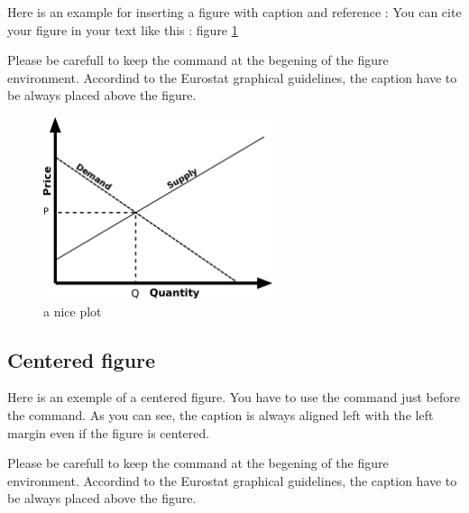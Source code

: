 \documentclass[Theme1]{{template_material/eurostat}}
\begin{document}
Here is an example for inserting a figure with caption and reference :
You can cite your figure in your text like this : figure \ref{fig:figure1}

Please be carefull to keep the  command at the begening of the figure environment. Accordind to the Eurostat graphical guidelines, the caption have to be always placed above the figure.

\begin{figure}[h]
    \caption{a nice plot} %
    \label{fig:figure1}
    \includegraphics[width=0.6\textwidth]{template_material/FiguresFiles/Simple_supply_and_demand.svg.png}
\end{figure}

\newpage
\subsection{Centered figure}

Here is an exemple of a centered figure. You have to use the  command just before the  command. As you can see, the caption is always aligned left with the left margin even if the figure is centered. 

Please be carefull to keep the  command at the begening of the figure environment. Accordind to the Eurostat graphical guidelines, the caption have to be always placed above the figure.
\end{document}
